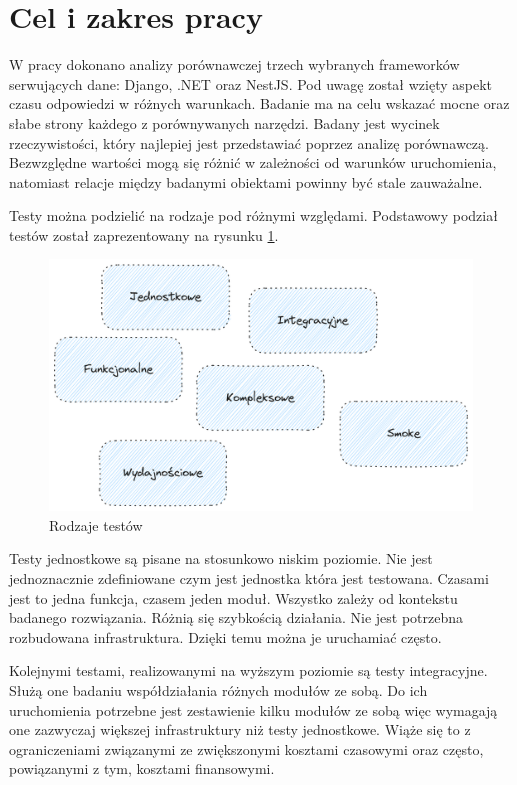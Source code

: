 \section{Cel i zakres pracy}

W pracy dokonano analizy porównawczej trzech wybranych frameworków serwujących dane: Django, .NET oraz NestJS.
Pod uwagę został wzięty aspekt czasu odpowiedzi w różnych warunkach.
Badanie ma na celu wskazać mocne oraz słabe strony każdego z porównywanych narzędzi.
Badany jest wycinek rzeczywistości, który najlepiej jest przedstawiać poprzez analizę porównawczą.
Bezwzględne wartości mogą się różnić w zależności od warunków uruchomienia, natomiast relacje między badanymi obiektami powinny być stale zauważalne.


Testy można podzielić na rodzaje pod różnymi względami. 
Podstawowy podział testów został zaprezentowany na rysunku \ref{rys:test-types}\cite{atlassianRneRodzaje}.
\begin{figure}[!hb]
	\centering \includegraphics[width=1\linewidth]{rysunki/test-types.png}
	\caption{Rodzaje testów}
	\label{rys:test-types}
\end{figure}
Testy jednostkowe są pisane na stosunkowo niskim poziomie.
Nie jest jednoznacznie zdefiniowane czym jest jednostka która jest testowana.
Czasami jest to jedna funkcja, czasem jeden moduł.
Wszystko zależy od kontekstu badanego rozwiązania.
Różnią się szybkością działania.
Nie jest potrzebna rozbudowana infrastruktura.
Dzięki temu można je uruchamiać często.

Kolejnymi testami, realizowanymi na wyższym poziomie są testy integracyjne.
Służą one badaniu współdziałania różnych modułów ze sobą. 
Do ich uruchomienia potrzebne jest zestawienie kilku modułów ze sobą więc wymagają one zazwyczaj większej infrastruktury niż testy jednostkowe.
Wiąże się to z ograniczeniami związanymi ze zwiększonymi kosztami czasowymi oraz często, powiązanymi z tym, kosztami finansowymi.

